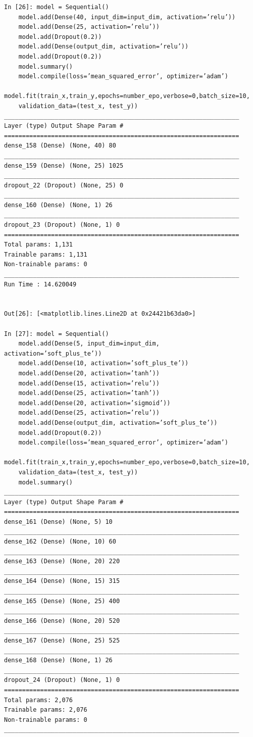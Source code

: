 \documentclass[10pt]{article}
\begin{document}
\begin{verbatim}
In [26]: model = Sequential()
    model.add(Dense(40, input_dim=input_dim, activation=’relu’))
    model.add(Dense(25, activation=’relu’))
    model.add(Dropout(0.2))
    model.add(Dense(output_dim, activation=’relu’))
    model.add(Dropout(0.2))
    model.summary()
    model.compile(loss=’mean_squared_error’, optimizer=’adam’)
    model.fit(train_x,train_y,epochs=number_epo,verbose=0,batch_size=10,
    validation_data=(test_x, test_y))
_________________________________________________________________
Layer (type) Output Shape Param #
=================================================================
dense_158 (Dense) (None, 40) 80
_________________________________________________________________
dense_159 (Dense) (None, 25) 1025
_________________________________________________________________
dropout_22 (Dropout) (None, 25) 0
_________________________________________________________________
dense_160 (Dense) (None, 1) 26
_________________________________________________________________
dropout_23 (Dropout) (None, 1) 0
=================================================================
Total params: 1,131
Trainable params: 1,131
Non-trainable params: 0
_________________________________________________________________
Run Time : 14.620049


Out[26]: [<matplotlib.lines.Line2D at 0x24421b63da0>]

In [27]: model = Sequential()
    model.add(Dense(5, input_dim=input_dim, activation=’soft_plus_te’))
    model.add(Dense(10, activation=’soft_plus_te’))
    model.add(Dense(20, activation=’tanh’))
    model.add(Dense(15, activation=’relu’))
    model.add(Dense(25, activation=’tanh’))
    model.add(Dense(20, activation=’sigmoid’))
    model.add(Dense(25, activation=’relu’))
    model.add(Dense(output_dim, activation=’soft_plus_te’))
    model.add(Dropout(0.2))
    model.compile(loss=’mean_squared_error’, optimizer=’adam’)
    model.fit(train_x,train_y,epochs=number_epo,verbose=0,batch_size=10,
    validation_data=(test_x, test_y))
    model.summary()
_________________________________________________________________
Layer (type) Output Shape Param #
=================================================================
dense_161 (Dense) (None, 5) 10
_________________________________________________________________
dense_162 (Dense) (None, 10) 60
_________________________________________________________________
dense_163 (Dense) (None, 20) 220
_________________________________________________________________
dense_164 (Dense) (None, 15) 315
_________________________________________________________________
dense_165 (Dense) (None, 25) 400
_________________________________________________________________
dense_166 (Dense) (None, 20) 520
_________________________________________________________________
dense_167 (Dense) (None, 25) 525
_________________________________________________________________
dense_168 (Dense) (None, 1) 26
_________________________________________________________________
dropout_24 (Dropout) (None, 1) 0
=================================================================
Total params: 2,076
Trainable params: 2,076
Non-trainable params: 0
_________________________________________________________________
\end{verbatim}
\end{document}
